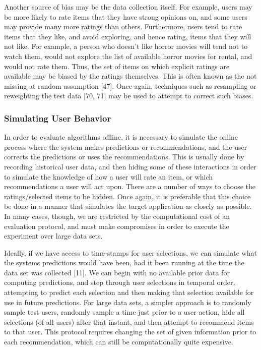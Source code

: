 Another source of bias may be the data collection itself. For example, users may be more likely to rate items that they have strong opinions on, and some users may provide many more ratings than others. Furthermore, users tend to rate items that they like, and avoid exploring, and hence rating, items that they will not like. For example, a person who doesn’t like horror movies will tend not to watch them, would not explore the list of available horror movies for rental, and would not rate them. Thus, the set of items on which explicit ratings are available may be biased by the ratings themselves. This is often known as the not missing at random assumption [47]. Once again, techniques such as resampling or reweighting the test data [70, 71] may be used to attempt to correct such biases.

\subsubsection{Simulating User Behavior}

In order to evaluate algorithms offline, it is necessary to simulate the online process where the system makes predictions or recommendations, and the user corrects the predictions or uses the recommendations. This is usually done by recording historical user data, and then hiding some of these interactions in order to simulate the knowledge of how a user will rate an item, or which recommendations a user will act upon. There are a number of ways to choose the ratings/selected items to be hidden. Once again, it is preferable that this choice be done in a manner that simulates the target application as closely as possible. In many cases, though, we are restricted by the computational cost of an evaluation protocol, and must make compromises in order to execute the experiment over large data sets.

Ideally, if we have access to time-stamps for user selections, we can simulate what the systems predictions would have been, had it been running at the time the data set was collected [11]. We can begin with no available prior data for computing predictions, and step through user selections in temporal order, attempting to predict each selection and then making that selection available for use in future predictions. For large data sets, a simpler approach is to randomly sample test users, randomly sample a time just prior to a user action, hide all selections (of all users) after that instant, and then attempt to recommend items to that user. This protocol requires changing the set of given information prior to each recommendation, which can still be computationally quite expensive.

